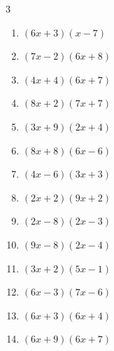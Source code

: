 \begin{multicols}{3}
\begin{enumerate}

  \item $(6x+3)(x-7)$


  \item $(7x-2)(6x+8)$


  \item $(4x+4)(6x+7)$


  \item $(8x+2)(7x+7)$


\columnbreak %

\resetques

  \item $(3x+9)(2x+4)$


  \item $(8x+8)(6x-6)$


  \item $(4x-6)(3x+3)$


  \item $(2x+2)(9x+2)$


  \item $(2x-8)(2x-3)$


  \item $(9x-8)(2x-4)$


  \item $(3x+2)(5x-1)$


  \item $(6x-3)(7x-6)$


  \item $(6x+3)(6x+4)$


  \item $(6x+9)(6x+7)$


\end{enumerate}
\end{multicols}
